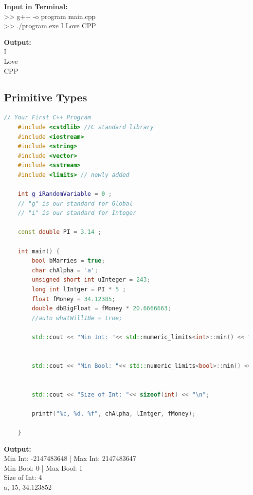 \documentclass[12pt , a4paper]{article}
\begin{document}
	\begin{tcolorbox}
	\textbf{Input in Terminal:}\\
	>> g++ -o program main.cpp\\
	>> ./program.exe I Love CPP 
	\end{tcolorbox}

	\begin{tcolorbox}
	\textbf{Output:}\\
	I\\
	Love\\
	CPP
	\end{tcolorbox}

	\subsection{Primitive Types}
	\begin{lstlisting}[language=C++]
	// Your First C++ Program
	#include <cstdlib> //C standard library
	#include <iostream>
	#include <string>
	#include <vector>
	#include <sstream>
	#include <limits> // newly added
	
	int g_iRandomVariable = 0 ;
	// "g" is our standard for Global
	// "i" is our standard for Integer
	
	const double PI = 3.14 ;
	
	int main() {
	    bool bMarries = true;
	    char chAlpha = 'a';
	    unsigned short int uInteger = 243;
	    long int lIntger = PI * 5 ;
	    float fMoney = 34.12385;
	    double dbBigFloat = fMoney * 20.6666663;
	    //auto whatWillIBe = true;
	
	    std::cout << "Min Int: "<< std::numeric_limits<int>::min() << " | Max Int: " <<std::numeric_limits<int>::max() <<"\n";


	    std::cout << "Min Bool: "<< std::numeric_limits<bool>::min() << " | Max Bool: " <<std::numeric_limits<bool>::max() <<"\n";


	    std::cout << "Size of Int: "<< sizeof(int) << "\n";

	    printf("%c, %d, %f", chAlpha, lIntger, fMoney);
	
	}
	\end{lstlisting}

	\begin{tcolorbox}
	\textbf{Output:}\\
	Min Int: -2147483648 | Max Int: 2147483647\\
	Min Bool: 0 | Max Bool: 1\\
	Size of Int: 4\\
	a, 15, 34.123852
	\end{tcolorbox}
\end{document}
